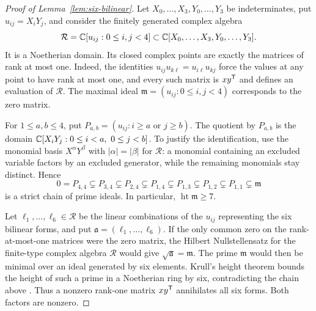 \begin{proof}[Proof of Lemma~\ref{lem:six-bilinear}]
Let $X_0,\ldots,X_3,Y_0,\ldots,Y_3$ be indeterminates, put $u_{ij}=X_iY_j$,
and consider the finitely generated complex algebra
\[
 \mathcal R=\mathbb C[u_{ij}:0\leq i,j<4]
 \subset\mathbb C[X_0,\ldots,X_3,Y_0,\ldots,Y_3].
\]
It is a Noetherian domain.  Its closed complex points are exactly the
matrices of rank at most one.  Indeed, the identities
$u_{ij}u_{k\ell}=u_{i\ell}u_{kj}$ force the values at any point to have
rank at most one, and every such matrix is $xy^{\mathsf T}$ and defines an
evaluation of $\mathcal R$.  The maximal ideal
$\mathfrak m=(u_{ij}:0\leq i,j<4)$ corresponds to the zero matrix.

For $1\leq a,b\leq4$, put
$P_{a,b}=(u_{ij}:i\geq a\text{ or }j\geq b)$.  The quotient by $P_{a,b}$
is the domain $\mathbb C[X_iY_j:0\leq i<a,\ 0\leq j<b]$.  To justify the
identification, use the monomial basis $X^\alpha Y^\beta$ with
$|\alpha|=|\beta|$ for $\mathcal R$: a monomial containing an excluded
variable factors by an excluded generator, while the remaining monomials
stay distinct.  Hence
\[
 0=P_{4,4}\subsetneq P_{3,4}\subsetneq P_{2,4}\subsetneq P_{1,4}
 \subsetneq P_{1,3}\subsetneq P_{1,2}\subsetneq P_{1,1}
 \subsetneq\mathfrak m
\]
is a strict chain of prime ideals.  In particular,
$\operatorname{ht}\mathfrak m\geq7$.

Let $\ell_1,\ldots,\ell_6\in\mathcal R$ be the linear combinations of
the $u_{ij}$ representing the six bilinear forms, and put
$\mathfrak a=(\ell_1,\ldots,\ell_6)$.  If the only common zero on the
rank-at-most-one matrices were the zero matrix, the Hilbert
Nullstellensatz for the finite-type complex algebra $\mathcal R$ would
give $\sqrt{\mathfrak a}=\mathfrak m$.  The prime $\mathfrak m$ would
then be minimal over an ideal generated by six elements.  Krull's height
theorem bounds the height of such a prime in a Noetherian ring by six,
contradicting the chain above
\cite[Tags 00FV and 0BBZ(1)]{Stacks}.  Thus a nonzero rank-one matrix
$xy^{\mathsf T}$ annihilates all six forms.  Both factors are nonzero.
\end{proof}

